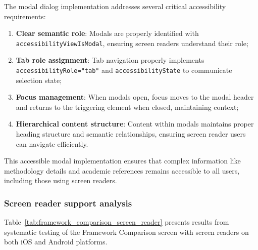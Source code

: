 The modal dialog implementation addresses several critical accessibility requirements:

\begin{enumerate}
    \item \textbf{Clear semantic role}: Modals are properly identified with \texttt{accessibilityViewIsModal}, ensuring screen readers understand their role;
    
    \item \textbf{Tab role assignment}: Tab navigation properly implements \texttt{accessibilityRole="tab"} and \texttt{accessibilityState} to communicate selection state;
    
    \item \textbf{Focus management}: When modals open, focus moves to the modal header and returns to the triggering element when closed, maintaining context;
    
    \item \textbf{Hierarchical content structure}: Content within modals maintains proper heading structure and semantic relationships, ensuring screen reader users can navigate efficiently.
\end{enumerate}

This accessible modal implementation ensures that complex information like methodology details and academic references remains accessible to all users, including those using screen readers.

\subsubsection{Screen reader support analysis}

Table~\ref{tab:framework_comparison_screen_reader} presents results from systematic testing of the Framework Comparison screen with screen readers on both iOS and Android platforms.

